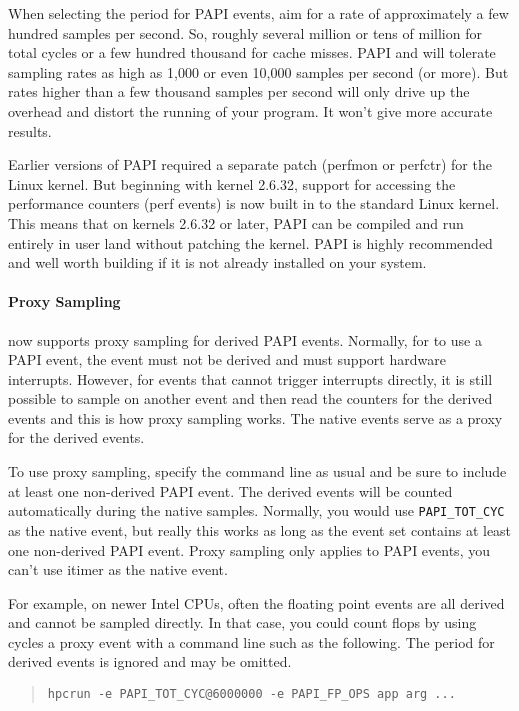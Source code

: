 When selecting the period for PAPI events, aim for a rate of
approximately a few hundred samples per second.  So, roughly several
million or tens of million for total cycles or a few hundred thousand
for cache misses.  PAPI and \hpcrun{} will tolerate sampling rates as
high as 1,000 or even 10,000 samples per second (or more).  But rates
higher than a few thousand samples per second will only drive up the
overhead and distort the running of your program.  It won't give more
accurate results.

Earlier versions of PAPI required a separate patch (perfmon or
perfctr) for the Linux kernel.  But beginning with kernel 2.6.32,
support for accessing the performance counters (perf events) is now
built in to the standard Linux kernel.  This means that on kernels
2.6.32 or later, PAPI can be compiled and run entirely in user land
without patching the kernel.  PAPI is highly recommended and well
worth building if it is not already installed on your system.

\paragraph{Proxy Sampling}

\HPCToolkit{} now supports proxy sampling for derived PAPI events.
Normally, for \HPCToolkit{} to use a PAPI event, the event must not be
derived and must support hardware interrupts.  However, for events
that cannot trigger interrupts directly, it is still possible to
sample on another event and then read the counters for the derived
events and this is how proxy sampling works.  The native events serve
as a proxy for the derived events.

To use proxy sampling, specify the \hpcrun{} command line as usual and
be sure to include at least one non-derived PAPI event.  The derived
events will be counted automatically during the native samples.
Normally, you would use \verb|PAPI_TOT_CYC| as the native event, but
really this works as long as the event set contains at least one
non-derived PAPI event.  Proxy sampling only applies to PAPI events,
you can't use itimer as the native event.

For example, on newer Intel CPUs, often the floating point events are
all derived and cannot be sampled directly.  In that case, you could
count flops by using cycles a proxy event with a command line such as
the following.  The period for derived events is ignored and may be
omitted.

\begin{quote}
\begin{verbatim}
hpcrun -e PAPI_TOT_CYC@6000000 -e PAPI_FP_OPS app arg ...
\end{verbatim}
\end{quote}

